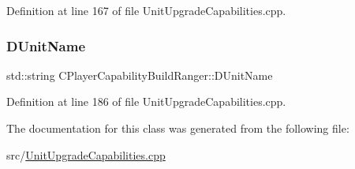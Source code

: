 Definition at line 167 of file Unit\+Upgrade\+Capabilities.\+cpp.

\hypertarget{classCPlayerCapabilityBuildRanger_a4e85674699365fe1e77bcb2a1996d7ba}{}\label{classCPlayerCapabilityBuildRanger_a4e85674699365fe1e77bcb2a1996d7ba} 
\subsubsection{\texorpdfstring{D\+Unit\+Name}{DUnitName}}
{\footnotesize\ttfamily std\+::string C\+Player\+Capability\+Build\+Ranger\+::\+D\+Unit\+Name\hspace{0.3cm}{\ttfamily [protected]}}



Definition at line 186 of file Unit\+Upgrade\+Capabilities.\+cpp.



The documentation for this class was generated from the following file\+:\begin{DoxyCompactItemize}
\item 
src/\hyperlink{UnitUpgradeCapabilities_8cpp}{Unit\+Upgrade\+Capabilities.\+cpp}\end{DoxyCompactItemize}
